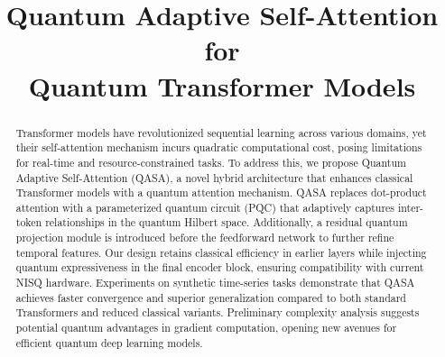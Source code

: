\documentclass[conference]{IEEEtran}
\begin{document}
\title{Quantum Adaptive Self-Attention for \\ Quantum Transformer Models \\
}

\author{
    
    
}


\maketitle

\begin{abstract}
Transformer models have revolutionized sequential learning across various domains, yet their self-attention mechanism incurs quadratic computational cost, posing limitations for real-time and resource-constrained tasks. To address this, we propose Quantum Adaptive Self-Attention (QASA), a novel hybrid architecture that enhances classical Transformer models with a quantum attention mechanism. QASA replaces dot-product attention with a parameterized quantum circuit (PQC) that adaptively captures inter-token relationships in the quantum Hilbert space. Additionally, a residual quantum projection module is introduced before the feedforward network to further refine temporal features. Our design retains classical efficiency in earlier layers while injecting quantum expressiveness in the final encoder block, ensuring compatibility with current NISQ hardware. Experiments on synthetic time-series tasks demonstrate that QASA achieves faster convergence and superior generalization compared to both standard Transformers and reduced classical variants. Preliminary complexity analysis suggests potential quantum advantages in gradient computation, opening new avenues for efficient quantum deep learning models.
\end{abstract}
\end{document}
